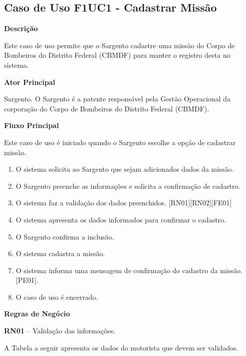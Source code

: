   \subsection{Caso de Uso F1UC1 - Cadastrar Missão}

  {\raggedright
      \textbf{Descrição}
  }
  
    Este caso de uso permite que o Sargento cadastre uma missão do Corpo de Bombeiros do Distrito Federal (CBMDF)  para manter o registro desta no sistema.    
  
  {\raggedright
      \textbf{Ator Principal}
  }

    Sargento. O Sargento é a patente responsável pela Gestão Operacional da corporação do Corpo de Bombeiros do Distrito Federal (CBMDF).
  
  {\raggedright
      \textbf{Fluxo Principal}
  }
  
    Este caso de uso é iniciado quando o Sargento escolhe a opção de cadastrar missão.
  
  \begin{enumerate}
  \item O sistema solicita ao Sargento que sejam adicionados dados da missão. 
  \item O Sargento preenche as informações e solicita a confirmação de cadastro.
  \item O sistema faz a validação dos dados preenchidos. [RN01][RN02][FE01]
  \item O sistema apresenta os dados informados para confirmar o cadastro.
  \item O Sargento confirma a inclusão. 
  \item O sistema cadastra a missão.
  \item O sistema informa uma mensagem de confirmação do cadastro da missão.[PE01].
  \item O caso de uso é encerrado.
  \end{enumerate}
  
  \pagebreak
  
   {\raggedright
      \textbf{Regras de Negócio}
   }
   
   \textbf{RN01} – Validação das informações.
   
   A Tabela a seguir apresenta os dados do motorista que devem ser validados.
   
